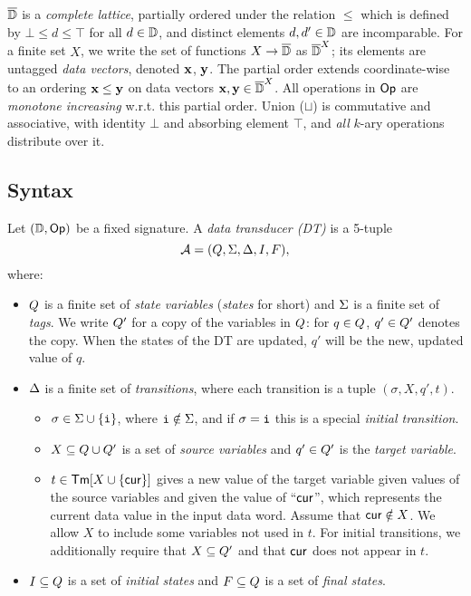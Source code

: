 $\overline{\mathbb{D}{}}$ is a \emph{complete lattice}, partially ordered under the
relation $\le$ which is defined by $\bot \le d \le \top$ for all $d \in \mathbb{D}$,
and distinct elements $d, d' \in \mathbb{D}$ are incomparable.
For a finite set $X$, we write the set of functions $X \to \overline{\mathbb{D}{}}$ as $\overline{\mathbb{D}{}}^X$; its elements are untagged \emph{data vectors}, denoted $\mathbf{x}$, $\mathbf{y}$.
The partial order extends coordinate-wise to an ordering $\mathbf{x} \le \mathbf{y}$ on data vectors $\mathbf{x}, \mathbf{y} \in \overline{\mathbb{D}{}}^X$.
All operations in $\textsf{Op}{}$ are \emph{monotone increasing}
w.r.t. this partial order.
Union ($\sqcup$) is commutative and associative, with identity $\bot$ and absorbing element $\top$,
and \emph{all} $k$-ary operations distribute over it.


\subsection{Syntax}
Let $(\mathbb{D}, \textsf{Op})$ be a fixed signature.
A \emph{data transducer (DT)} is a 5-tuple
\[
\mathcal{A} = (Q, \Sigma, \Delta, I, F),
\]
where:
\begin{itemize}
\item $Q$ is a finite set of \emph{state variables} (\emph{states} for short) and $\Sigma$ is a finite set of \emph{tags}.
We write $Q'$ for a copy of the variables in $Q$: for $q \in Q$, $q' \in Q'$ denotes the copy. When the states of the DT are updated, $q'$ will be the new, updated value of $q$.
\item $\Delta$ is a finite set of \emph{transitions},
where each transition is a tuple $(\sigma, X, q', t)$.
\begin{itemize}
\item $\sigma \in \Sigma \cup \{\texttt{i}\}$,
where $\texttt{i} \notin \Sigma$, and if $\sigma = \texttt{i}$ this is a special \emph{initial transition}.
\item $X \subseteq Q \cup Q'$ is a set of
\emph{source variables} and $q' \in Q'$ is the \emph{target variable}.
\item $t \in \textsf{Tm}[X \cup \{\mathsf{cur}\}]$ gives a new value of the target variable given values of the source variables
and given the value of ``$\mathsf{cur}$'', which represents the current data value in the input data word.
Assume that $\mathsf{cur} \notin X$.
We allow $X$ to include some variables not used in $t$.
For initial transitions, we additionally require that $X \subseteq Q'$ and that $\mathsf{cur}$ does not appear in $t$.
\end{itemize}
\item $I \subseteq Q$ is a set of \emph{initial states} and $F \subseteq Q$ is a set of \emph{final states}.
\end{itemize}

